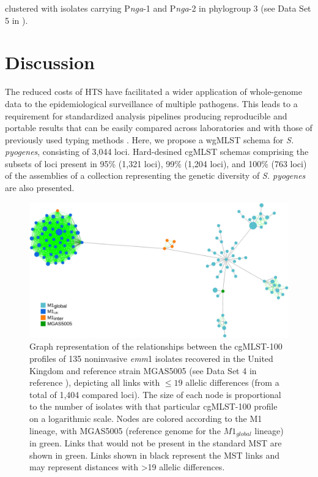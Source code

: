 clustered with isolates carrying P\textit{nga}-1 and P\textit{nga}-2 in phylogroup 3 (see Data Set 5 in \cite{friaes_supplemental_2023}).

\section{Discussion} \label{sec:ch4_discussion}

The reduced costs of \ac{HTS} have facilitated a wider application of whole-genome data to the epidemiological surveillance of multiple pathogens. This leads to a requirement for standardized analysis pipelines producing reproducible and portable results that can be easily compared across laboratories and with those of previously used typing methods \cite{sabat_overview_2013}. Here, we propose a \ac{wgMLST} schema for \textit{S. pyogenes}, consisting of 3,044 loci. Hard-desined \ac{cgMLST} schemas comprising the subsets of loci present in 95\% (1,321 loci), 99\% (1,204 loci), and 100\% (763 loci) of the assemblies of a collection representing the genetic diversity of \textit{S. pyogenes} \cite{davies_atlas_2019} are also presented.

\begin{figure}[!ht]
    \centering
    \includegraphics[width=\textwidth]{figures/chapter 4/Figure5.pdf}
    \caption[Graph representation of the relationships between the cgMLST-100 profiles of 135 noninvasive \textit{emm}1 isolates recovered in the United Kingdom and reference strain MGAS5005, depicting all links with $\leq19$ allelic differences (from a total of 1,404 compared loci).]{Graph representation of the relationships between the cgMLST-100 profiles of 135 noninvasive \textit{emm}1 isolates recovered in the United Kingdom \cite{lynskey_emergence_2019} and reference strain MGAS5005 (see Data Set 4 in reference \cite{friaes_supplemental_2023}), depicting all links with $\leq19$ allelic differences (from a total of 1,404 compared loci). The size of each node is proportional to the number of isolates with that particular cgMLST-100 profile on a logarithmic scale. Nodes are colored according to the M1 lineage, with MGAS5005 (reference genome for the $M1_{global}$ lineage) in green. Links that would not be present in the standard \ac{MST} are shown in green. Links shown in black represent the \ac{MST} links and may represent distances with >19 allelic differences.}
    \label{fig:chap4_figure5}
\end{figure}

